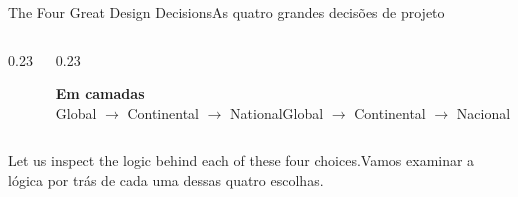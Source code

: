 \documentclass[aspectratio=169,11pt]{beamer}
\newcommand{\tr}[2]{\ifEN#2\else#1\fi}
\begin{document}
\begin{frame}{\tr{As quatro grandes decisões de projeto}{The Four Great Design Decisions}}
\begin{columns}[onlytextwidth]
\begin{column}{0.23\textwidth}
\begin{tcolorbox}[colback=mStoneLight, colframe=mAmber, title=\centering \scriptsize \tr{3. A Técnica}{3. The Technique}]
      \end{tcolorbox}
    \end{column}
    \begin{column}{0.23\textwidth}
      \begin{tcolorbox}[colback=mStoneLight, colframe=mRose, title=\centering \scriptsize \tr{4. A Estrutura}{4. The Structure}]
        \centering \tiny \textbf{Em camadas}\\[2pt]
        \tr{Global $\to$ Continental $\to$ Nacional}{Global $\to$ Continental $\to$ National}
      \end{tcolorbox}
    \end{column}
  \end{columns}
  \vspace{0.3cm}
  \tr{Vamos examinar a lógica por trás de cada uma dessas quatro escolhas.}{Let us inspect the logic
  behind each of these four choices.}
\end{frame}
\end{document}
